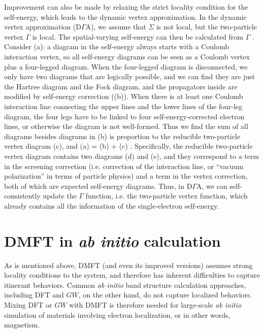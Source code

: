 \documentclass[hyperref, a4paper]{article}
\begin{document}
Improvement can also be made by relaxing the strict locality condition for the self-energy,
which leads to the dynamic vertex approximation.
In the dynamic vertex approximation (D$\Gamma$A),
we assume that $\Sigma$ is not local,
but the two-particle vertex $\Gamma$ is local.
The spatial-varying self-energy can then be calculated from $\Gamma$ \cite{bickers1991conserving}.
Consider (a):  
a diagram in the self-energy always starts with a Coulomb interaction vertex,
so all self-energy diagrams can be seen as a Coulomb vertex plus a four-legged diagram.
When the four-legged diagram is disconnected, we only have two diagrams that are logically possible,
and we can find they are just the Hartree diagram and the Fock diagram,
and the propagators inside are modified by self-energy correction ((b)).
When there is at least one Coulomb interaction line connecting the upper lines and the lower lines 
of the four-leg diagram, the four legs have to be linked to four self-energy-corrected electron lines,
or otherwise the diagram is not well-formed.
Thus we find the sum of all diagrams besides diagrams in (b) 
is proportion to the reducible two-particle vertex diagram (c),
and (a) = (b) + (c) \cite{bickers1991conserving}.
Specifically, the reducible two-particle vertex diagram contains two diagrams (d) and (e), 
and they correspond to a term in the screening correction 
(i.e. correction of the interaction line, or ``vacuum polarization'' in terms of particle physics)
and a term in the vertex correction,
both of which are expected self-energy diagrams.
Thus, in D$\Gamma$A, we can self-consistently update the $\Gamma$ function, 
i.e. the two-particle vertex function, 
which already contains all the information of the single-electron self-energy.

\section{DMFT in \textit{ab initio} calculation}\label{sec:ab-initio}

As is mentioned above, 
DMFT (and even its improved versions)
assumes strong locality conditions to the system,
and therefore has inherent difficulties to capture itinerant behaviors.
Common \textit{ab initio} band structure calculation approaches,
including DFT and $GW$, 
on the other hand, 
do not capture localized behaviors.
Mixing DFT or $GW$ with DMFT is therefore needed 
for large-scale \textit{ab initio} simulation 
of materials involving electron localization,
or in other words, magnetism.
\end{document}

